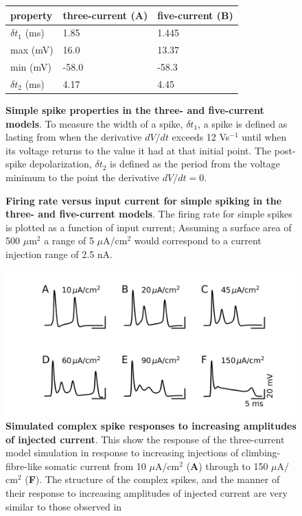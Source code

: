 \documentclass[twocolumn]{svjour3}          %
\begin{document}
\begin{figure}[!ht]
  
  \caption{\textbf{Simple spike properties in the three- and
      five-current models}. To measure the width of a spike, $\delta
    t_1$, a spike is defined as lasting from when the derivative
    $dV/dt$ exceeds 12 Vs$^{-1}$ until when its voltage returns to the
    value it had at that initial point. The post-spike depolarization,
    $\delta t_2$ is defined as the period from the voltage minimum
    to the point the derivative $dV/dt=0$.\label{fig:spike_properties}}
  \begin{center}
    \begin{tabular}{|l l l|}
      \hline
      property & three-current (\textbf{A}) & five-current (\textbf{B})\\ \hline
      $\delta t_1$ (ms)& 1.85&1.445\\
      max (mV)&16.0&13.37\\
      min (mV)&-58.0 &-58.3\\
      $\delta t_2$ (ms)&4.17&4.45\\
      \hline
    \end{tabular}
    \end{center}
\end{figure}

\begin{figure}[!ht]
  
  \caption{\textbf{Firing rate versus input current for simple spiking in
      the three- and five-current models}. The firing rate for simple
    spikes is plotted as a function of input current; Assuming a
    surface area of 500 $\mu$m$^2$ a range of 5 $\mu$A$/$cm$^2$ would
    correspond to a current injection range of 2.5
    nA.\label{fig:fi_curves}}

\end{figure}


\begin{figure}[!ht]
\includegraphics[width=\linewidth]{figure_cs_i.jpg}
\caption{\textbf{Simulated complex spike responses to increasing
            amplitudes of injected current}. This show the response of the
  three-current model simulation in response to increasing injections
  of climbing-fibre-like somatic current from 10 $\mu$A$/$cm$^2$
  (\textbf{A}) through to 150 $\mu$A$/$cm$^2$ (\textbf{F}). The
  structure of the complex spikes, and the manner of their response to
  increasing amplitudes of injected current are very similar to those
  observed in \cite{DavieEtAl2008}}
\label{fig_cs_i}
\end{figure}
\end{document}
